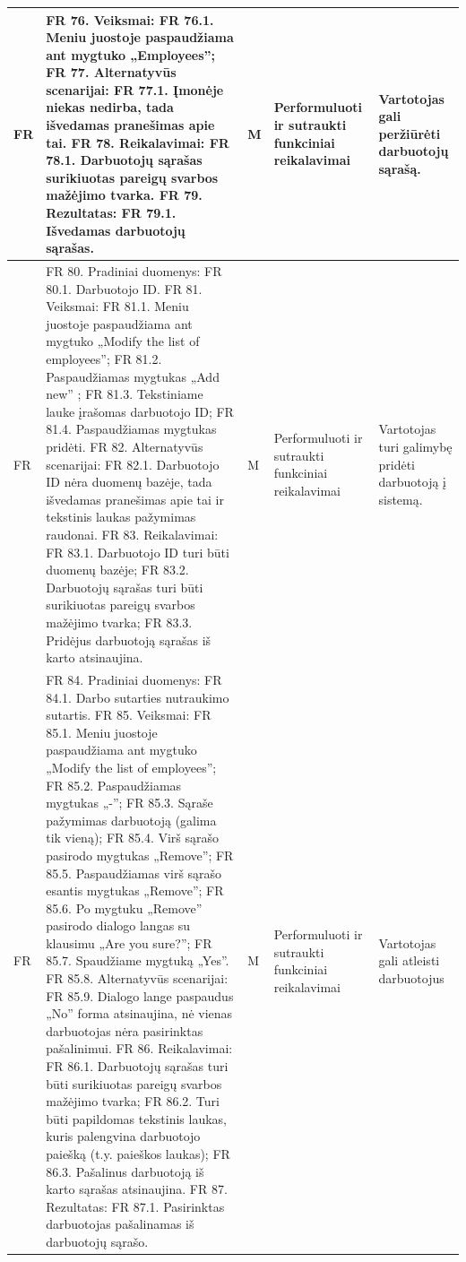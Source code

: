 \documentclass[oneside]{VUMIFPSkursinis}
\begin{document}
\begin{longtable}{ | p{}|p{}|p{}|p{}|p{}| }
FR & FR 76. Veiksmai:
FR 76.1. Meniu juostoje paspaudžiama ant mygtuko „Employees”;
FR 77. Alternatyvūs scenarijai:
FR 77.1. Įmonėje niekas nedirba, tada išvedamas pranešimas apie tai.
FR 78. Reikalavimai:
FR 78.1. Darbuotojų sąrašas surikiuotas pareigų svarbos mažėjimo tvarka.
FR 79. Rezultatas:
FR 79.1. Išvedamas darbuotojų sąrašas. & M & Performuluoti ir sutraukti funkciniai reikalavimai & Vartotojas gali peržiūrėti darbuotojų sąrašą. \\ \hline

FR & FR 80. Pradiniai duomenys:
FR 80.1. Darbuotojo ID.
FR 81. Veiksmai:
FR 81.1. Meniu juostoje paspaudžiama ant mygtuko „Modify the list of employees”;
FR 81.2. Paspaudžiamas mygtukas „Add new” ;
FR 81.3. Tekstiniame lauke įrašomas darbuotojo ID;
FR 81.4. Paspaudžiamas mygtukas pridėti.
FR 82. Alternatyvūs scenarijai:
FR 82.1. Darbuotojo ID nėra duomenų bazėje, tada išvedamas pranešimas apie tai ir tekstinis laukas pažymimas raudonai.
FR 83. Reikalavimai:
FR 83.1. Darbuotojo ID turi būti duomenų bazėje;
FR 83.2. Darbuotojų sąrašas turi būti surikiuotas pareigų svarbos mažėjimo tvarka;
FR 83.3. Pridėjus darbuotoją sąrašas iš karto atsinaujina. & M & Performuluoti ir sutraukti funkciniai reikalavimai & Vartotojas turi galimybę pridėti darbuotoją į sistemą. \\ \hline

FR & FR 84. Pradiniai duomenys:
FR 84.1. Darbo sutarties nutraukimo sutartis.
FR 85. Veiksmai:
FR 85.1. Meniu juostoje paspaudžiama ant mygtuko „Modify the list of employees”;
FR 85.2. Paspaudžiamas mygtukas „-”;
FR 85.3. Sąraše pažymimas darbuotoją (galima tik vieną);
FR 85.4. Virš sąrašo pasirodo mygtukas „Remove”;
FR 85.5. Paspaudžiamas virš sąrašo esantis mygtukas „Remove”;
FR 85.6. Po mygtuku „Remove” pasirodo dialogo langas su klausimu „Are you sure?”;
FR 85.7. Spaudžiame mygtuką „Yes”.
FR 85.8. Alternatyvūs scenarijai:
FR 85.9. Dialogo lange paspaudus „No” forma atsinaujina, nė vienas darbuotojas nėra pasirinktas pašalinimui.
FR 86. Reikalavimai:
FR 86.1. Darbuotojų sąrašas turi būti surikiuotas pareigų svarbos mažėjimo tvarka;
FR 86.2. Turi būti papildomas tekstinis laukas, kuris palengvina darbuotojo paiešką (t.y. paieškos laukas);
FR 86.3. Pašalinus darbuotoją iš karto sąrašas atsinaujina.
FR 87. Rezultatas:
FR 87.1. Pasirinktas darbuotojas pašalinamas iš darbuotojų sąrašo. & M & Performuluoti ir sutraukti funkciniai reikalavimai & Vartotojas gali atleisti darbuotojus \\ \hline


\end{longtable}
\end{document}
